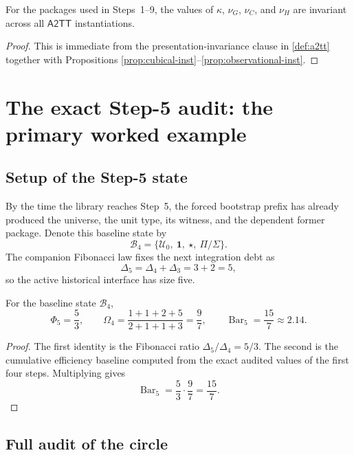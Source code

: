\documentclass{lmcs}
\newcommand{\U}{\mathcal{U}}
\newcommand{\B}{\mathcal{B}}
\newcommand{\ATwoTT}{\mathsf{A2TT}}
\newcommand{\SelBar}{\operatorname{Bar}}
\begin{document}
\begin{cor}
\label{cor:invariance}
For the packages used in Steps~1--9, the values of $\kappa$, $\nu_G$, $\nu_C$, and $\nu_H$ are invariant across all $\ATwoTT$ instantiations.
\end{cor}

\begin{proof}
This is immediate from the presentation-invariance clause in \autoref{def:a2tt} together with Propositions \ref{prop:cubical-inst}--\ref{prop:observational-inst}.
\end{proof}

\section{The exact Step-5 audit: the primary worked example}
\label{sec:step5}

\subsection{Setup of the Step-5 state}

By the time the library reaches Step~5, the forced bootstrap prefix has already produced the universe, the unit type, its witness, and the dependent former package. Denote this baseline state by
\[
  \B_4 = \{\U_0,\ \mathbf 1,\ \star,\ \Pi/\Sigma\}.
\]
The companion Fibonacci law fixes the next integration debt as
\[
  \Delta_5 = \Delta_4 + \Delta_3 = 3 + 2 = 5,
\]
so the active historical interface has size five.

\begin{lem}
\label{lem:step5-bar}
For the baseline state $\B_4$,
\[
  \Phi_5 = \frac{5}{3},
  \qquad
  \Omega_4 = \frac{1+1+2+5}{2+1+1+3} = \frac{9}{7},
  \qquad
  \SelBar_5 = \frac{15}{7} \approx 2.14.
\]
\end{lem}

\begin{proof}
The first identity is the Fibonacci ratio $\Delta_5/\Delta_4 = 5/3$. The second is the cumulative efficiency baseline computed from the exact audited values of the first four steps. Multiplying gives
\[
  \SelBar_5 = \frac{5}{3}\cdot\frac{9}{7} = \frac{15}{7}.
\]
\end{proof}

\subsection{Full audit of the circle}
\end{document}
